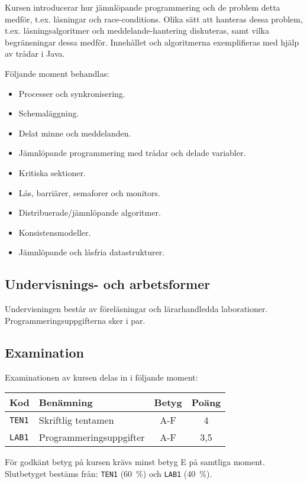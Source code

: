 Kursen introducerar hur jämnlöpande programmering och de problem detta
medför, t.ex. låsningar och race-conditions. Olika sätt att hanteras
dessa problem, t.ex. låsningsalgoritmer och meddelande-hantering
diskuteras, samt vilka begränsningar dessa medför. Innehållet och
algoritmerna exemplifieras med hjälp av trådar i Java.

Följande moment behandlas:

\begin{itemize}
\tightlist
\item
  Processer och synkronisering.
\item
  Schemaläggning.
\item
  Delat minne och meddelanden.
\item
  Jämnlöpande programmering med trådar och delade variabler.
\item
  Kritiska sektioner.
\item
  Lås, barriärer, semaforer och monitors.
\item
  Distribuerade/jämnlöpande algoritmer.
\item
  Konsistensmodeller.
\item
  Jämnlöpande och låsfria datastrukturer.
\end{itemize}

\subsection*{Undervisnings- och
arbetsformer}

Undervisningen består av föreläsningar och lärarhandledda laborationer.
Programmeringsuppgifterna sker i par.

\subsection*{Examination}

Examinationen av kursen delas in i följande moment:

\begin{longtable}[]{@{}llcc@{}}
\toprule
\textsf{Kod} & \textsf{Benämning} & \textsf{Betyg} & \textsf{Poäng}\tabularnewline
\midrule
\endhead
\texttt{TEN1} & Skriftlig tentamen & A-F & 4\tabularnewline
\texttt{LAB1} & Programmeringsuppgifter & A-F & 3,5\tabularnewline
\bottomrule
\end{longtable}

För godkänt betyg på kursen krävs minst betyg E på samtliga moment.
Slutbetyget bestäms från: \texttt{TEN1} (60~\%) och \texttt{LAB1} (40~\%).

